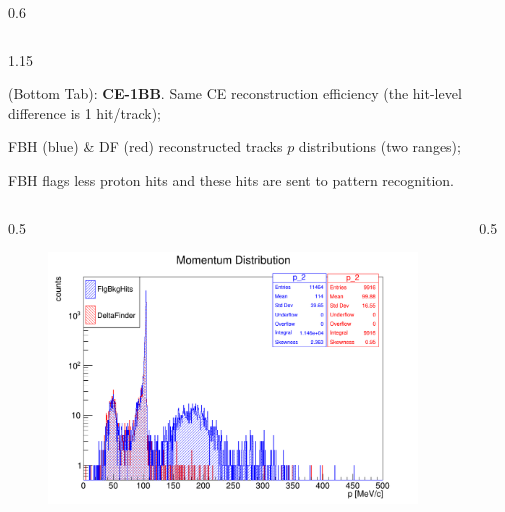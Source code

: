 \documentclass{beamer}
\begin{document}
\begin{frame}
\begin{columns}
\begin{column}{0.6\framewidth}
        \end{column}
    \end{columns}
    \vspace{-6mm}
 \begin{columns}
        \begin{column}{1.15\framewidth}
    \setlength{\leftmargini}{1.1em}
    \begin{itemize}
    {\small   
    \item (Bottom Tab): \textbf{CE-1BB}. Same CE reconstruction efficiency (the hit-level difference is 1 hit/track);
        \vspace{-0.5mm}
    \item FBH (blue) \& DF (red) reconstructed tracks $p$ distributions (two ranges);
    \vspace{-0.5mm}
    \item FBH flags less proton hits and these hits are sent to pattern recognition.
    }
    \end{itemize}
    \end{column}
    \end{columns}
        \vspace{-3mm}
     \begin{columns}
        \begin{column}{0.5\framewidth}
            \begin{figure}[!h]
        \centering
        \includegraphics[width =0.9\columnwidth]{figures/png/Screenshot_20240820_162125.png}
       \label{fig:momhits}
\end{figure}
        \end{column}
        \begin{column}{0.5\framewidth}
               \begin{figure}[!h]
        \centering

\end{figure}
\end{column}
\end{columns}
\end{frame}
\end{document}
